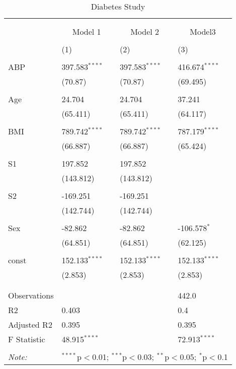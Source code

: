 \begin{table}[!htbp] \centering
  \caption{Diabetes Study}
  \label{}
\begin{tabularx}{\textwidth}{lXXX}
\\[-1.8ex]\hline
\hline \\[-1.8ex]
& \multicolumn{3}{c}{\textit{}} \
\cr \cline{3-4}
\\[-1.8ex] & \multicolumn{1}{c}{Model 1} & \multicolumn{1}{c}{Model 2} & \multicolumn{1}{c}{Model3}  \\
\\[-1.8ex] & (1) & (2) & (3) \\
\hline \\[-1.8ex]
 ABP & 397.583$^{****}$ & 397.583$^{****}$ & 416.674$^{****}$ \\
  & (70.87) & (70.87) & (69.495) \\
  & & & \\
 Age & 24.704$^{}$ & 24.704$^{}$ & 37.241$^{}$ \\
  & (65.411) & (65.411) & (64.117) \\
  & & & \\
 BMI & 789.742$^{****}$ & 789.742$^{****}$ & 787.179$^{****}$ \\
  & (66.887) & (66.887) & (65.424) \\
  & & & \\
 S1 & 197.852$^{}$ & 197.852$^{}$ & \\
  & (143.812) & (143.812) & \\
  & & & \\
 S2 & -169.251$^{}$ & -169.251$^{}$ & \\
  & (142.744) & (142.744) & \\
  & & & \\
 Sex & -82.862$^{}$ & -82.862$^{}$ & -106.578$^{*}$ \\
  & (64.851) & (64.851) & (62.125) \\
  & & & \\
 const & 152.133$^{****}$ & 152.133$^{****}$ & 152.133$^{****}$ \\
  & (2.853) & (2.853) & (2.853) \\
  & & & \\
\hline \\[-1.8ex]
 Observations &   &   & 442.0 \\
 R${2}$ & 0.403 &   & 0.4 \\
 Adjusted R${2}$ & 0.395 &   & 0.395 \\
 F Statistic & 48.915$^{****}$  &     & 72.913$^{****}$  \\
\hline
\hline \\[-1.8ex]
\textit{Note:} & \multicolumn{3}{r}{$^{****}$p$<$0.01; $^{***}$p$<$0.03; $^{**}$p$<$0.05; $^{*}$p$<$0.1} \\
\end{tabularx}
\end{table}